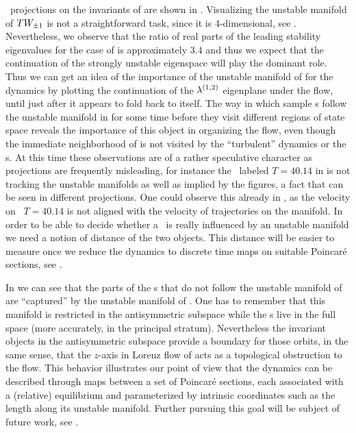 \Statesp\ projections on the invariants of  are shown in
.
Visualizing the unstable manifold of $TW_{\pm1}$ is not a
straightforward task, since it is $4$-dimensional, see .
Nevertheless, we observe that the ratio of real parts of the leading stability eigenvalues for the case of  is approximately $3.4$ and thus we expect that the continuation of the strongly
unstable eigenspace will play the dominant role. Thus we can get an idea of the importance
of the unstable manifold of  for the dynamics
by plotting the continuation of the $\eigExp[1,2]$ eigenplane under the flow,
until just after it appears to fold back to itself.
The way
in which sample {\rpo s} follow the unstable manifold in
 for some time before they visit different
regions of state space reveals the importance of this object
in organizing the flow, even though the immediate neighborhood of
 is not visited by the ``turbulent'' dynamics or
the \rpo s.
At this time these observations are
of a rather speculative character as projections
are frequently misleading,
for instance the \rpo\ labeled $T=40.14$ in
 is not tracking the unstable manifolds as
well as implied by the figures, a fact that can be seen in
different projections. One could observe this already in
, as the velocity on \rpo\ $T=40.14$ is
not aligned with the velocity of trajectories on the
manifold. In order to be able to decide whether a \rpo\ is
really influenced by an unstable manifold we need a notion of
distance of the two objects. This distance will be easier to measure
once we reduce the dynamics to discrete time maps on
suitable Poincar\'e sections, see .

In  we can see that the parts of
the {\rpo s} that do not follow the unstable manifold of
 are ``captured'' by the unstable manifold of
. One has to remember that this manifold is restricted
in the antisymmetric subspace while the {\rpo s} live in the
full space (more accurately, in the principal stratum).
Nevertheless the invariant objects in the antisymmetric
subspace provide a boundary for those orbits, in the same
 sense, that the $z$-axis in Lorenz flow
 of  acts as a topological
obstruction to the flow. This behavior illustrates our point
of view that the dynamics can be described through maps
between a set of Poincar\'e sections, each associated with a
(relative) equilibrium and parameterized by intrinsic
coordinates such as the length along its unstable manifold.
Further pursuing this goal will be subject of future work,
see .

